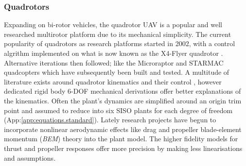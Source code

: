 \subsubsection*{Quadrotors}
Expanding on bi-rotor vehicles, the quadrotor UAV is a popular and well researched multirotor platform due to its mechanical simplicity. The current popularity of quadrotors as research platforms started in 2002, with a control algrithm implemented on what is now known as the X4-Flyer quadrotor \cite{x4flyer,x4flyercontrol}. Alternative iterations then followed; like the Microraptor\cite{microraptor} and STARMAC\cite{starmac} quadcopters which have subsequently been built and tested. A multitude of literature exists around quadrotor kinematics and their control \cite{dynamicmodelling2013, quaddynamics, fullquadcoptercontrol}, however dedicated rigid body 6-DOF mechanical derivations \cite{rigidbodylecture,eulerrigidbody} offer better explanations of the kinematics. Often the plant's dynamics are simplified around an origin trim point and assumed to reduce into six SISO plants for each degree of freedom (App:\ref{app:equations.standard}). Lately research projects have begun to incorporate nonlinear aerodynamic effects like drag and propeller blade-element momentum (\emph{BEM}) theory into the plant model\cite{lowreynolds,bem,starmac,nonlineardynamics}. The higher fidelity models for thrust and propeller responses offer more precision by making less linearisations and assumptions.
\par
